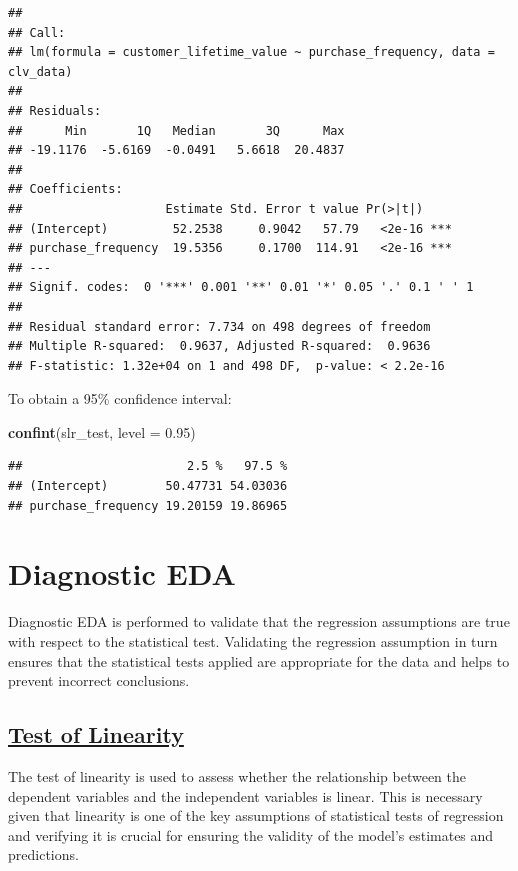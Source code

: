 \documentclass[
]{article}
\newenvironment{Shaded}{\begin{snugshade}}{\end{snugshade}}
\newcommand{\AttributeTok}[1]{\textcolor[rgb]{0.13,0.29,0.53}{#1}}
\newcommand{\FloatTok}[1]{\textcolor[rgb]{0.00,0.00,0.81}{#1}}
\newcommand{\FunctionTok}[1]{\textcolor[rgb]{0.13,0.29,0.53}{\textbf{#1}}}
\newcommand{\NormalTok}[1]{#1}
\begin{document}
\begin{verbatim}
## 
## Call:
## lm(formula = customer_lifetime_value ~ purchase_frequency, data = clv_data)
## 
## Residuals:
##      Min       1Q   Median       3Q      Max 
## -19.1176  -5.6169  -0.0491   5.6618  20.4837 
## 
## Coefficients:
##                    Estimate Std. Error t value Pr(>|t|)    
## (Intercept)         52.2538     0.9042   57.79   <2e-16 ***
## purchase_frequency  19.5356     0.1700  114.91   <2e-16 ***
## ---
## Signif. codes:  0 '***' 0.001 '**' 0.01 '*' 0.05 '.' 0.1 ' ' 1
## 
## Residual standard error: 7.734 on 498 degrees of freedom
## Multiple R-squared:  0.9637, Adjusted R-squared:  0.9636 
## F-statistic: 1.32e+04 on 1 and 498 DF,  p-value: < 2.2e-16
\end{verbatim}

To obtain a 95\% confidence interval:

\begin{Shaded}
\begin{Highlighting}[]
\FunctionTok{confint}\NormalTok{(slr\_test, }\AttributeTok{level =} \FloatTok{0.95}\NormalTok{)}
\end{Highlighting}
\end{Shaded}

\begin{verbatim}
##                       2.5 %   97.5 %
## (Intercept)        50.47731 54.03036
## purchase_frequency 19.20159 19.86965
\end{verbatim}

\section{Diagnostic EDA}\label{diagnostic-eda}

Diagnostic EDA is performed to validate that the regression assumptions
are true with respect to the statistical test. Validating the regression
assumption in turn ensures that the statistical tests applied are
appropriate for the data and helps to prevent incorrect conclusions.

\subsection{\texorpdfstring{\ul{\textbf{Test of
Linearity}}}{Test of Linearity}}\label{test-of-linearity}

The test of linearity is used to assess whether the relationship between
the dependent variables and the independent variables is linear. This is
necessary given that linearity is one of the key assumptions of
statistical tests of regression and verifying it is crucial for ensuring
the validity of the model's estimates and predictions.
\end{document}
